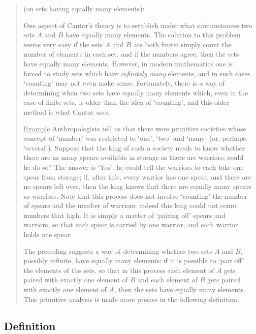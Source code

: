 \begin{quotation}
{\footnotesize \underline{\Note} (on sets having equally many elements):

        One aspect of Cantor's theory is to establish under what circumstances two sets $A$ and $B$ have equally many elements.
    The solution to this problem seems very easy if the sets $A$ and $B$ are both finite:
    simply count the number of elements in each set, and if the numbers agree, then the sets have equally many elements.
    However, in modern mathematics one is forced to study sets which have {\em infinitely many} elements, and in such cases `counting' may not even make sense.
    Fortunately, there is a way of determining when two sets have equally many elements which,
    even in the case of finite sets, is older than the idea of `counting', and this older method is what Cantor uses.

\VA

        \underline{Example} Anthropologists tell us that there were primitive societies
    whose concept of `number' was restricted to `one', `two' and `many' (or, perhaps, `several').
    Suppose that the king of such a society needs to know whether there are as many spears available in storage as there are warriors;
    could he do so? The answer is `Yes': he could tell the warriors to each take one spear from storage;
    if, after this, every warrior has one spear, and there are no spears left over, then the king knows that there are equally many spears as warriors.
    Note that this process does not involve `counting' the number of spears and the number of warriors; indeed this king could not count numbers that high.
    It is simply a matter of `pairing off' spears and warriors, so that each spear is carried by one warrior, and each warrior holds one spear.

\VA

        The preceding suggests a way of determining whether two sets $A$ and $B$, possibly infinite, have equally many elements:
    if it is possible to `pair off' the elements of the sets, so that in this process each element of $A$ gets paired with exactly one element of $B$
    and each element of $B$ gets paired with exactly one element of $A$, then the sets have equally many elements.
    This primitive analysis is made more precise in the following definition.
}%
\end{quotation}

        \subsection{\small{\bf Definition}}
            \label{DefA12.70}

